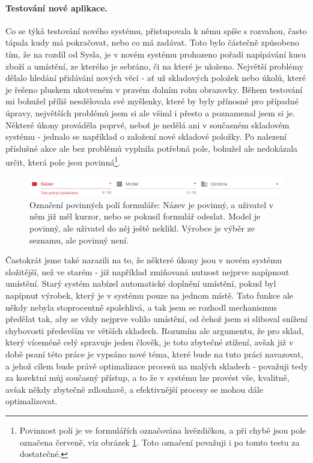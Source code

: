 \paragraph{Testování nové aplikace.} Co se týká testování nového systému, přistupovala k němu spíše s rozvahou, často tápala kudy má pokračovat, nebo co má zadávat. Toto bylo částečně způsobeno tím, že na rozdíl od Sysla, je v novém systému prohozeno pořadí napípávání kusu zboží a umístění, ze kterého je sebráno, či na které je uloženo. Největší problémy dělalo hledání přidávání nových věcí - ať už skladových položek nebo úkolů, které je řešeno pluskem ukotveném v pravém dolním rohu obrazovky. Během testování mi bohužel příliš nesdělovala své myšlenky, které by byly přínosné pro případné úpravy, největších problémů jsem si ale všiml i přesto a poznamenal jsem si je.\\
Některé úkony prováděla poprvé, neboť je nedělá ani v současném skladovém systému - jednalo se například o založení nové skladové položky. Po nalezení příslušné akce ale bez problémů vyplnila potřebná pole, bohužel ale nedokázala určit, která pole jsou povinná\footnote{Povinnost polí je ve formulářích označována hvězdičkou, a při chybě jsou pole označena červeně, viz obrázek \ref{picture:test:required_fields}. Toto označení považuji i po tomto testu za dostatečné.}.\\

\begin{figure}[h]
\includegraphics[width=\textwidth]{../png/app_testing/required_fields.png}
\caption[Označení povinných polí formuláře]{Označení povinných polí formuláře: Název je povinný, a uživatel v něm již měl kurzor, nebo se pokusil formulář odeslat. Model je povinný, ale uživatel do něj ještě neklikl. Výrobce je výběr ze seznamu, ale povinný není.} \label{picture:test:required_fields}
\end{figure}

Častokrát jsme také narazili na to, že některé úkony jsou v novém systému složitější, než ve starém - již například zmiňovaná nutnost nejprve napípnout umístění. Starý systém nabízel automatické doplnění umístění, pokud byl napípnut výrobek, který je v systému pouze na jednom místě. Tato funkce ale někdy nebyla stoprocentně spolehlivá, a tak jsem se rozhodl mechanismus předělat tak, aby se vždy nejprve volilo umístění, od čehož jsem si sliboval snížení chybovosti především ve větších skladech. Rozumím ale argumentu, že pro sklad, který víceméně celý spravuje jeden člověk, je toto zbytečné ztížení, avšak již v době psaní této práce je vypsáno nové téma, které bude na tuto práci navazovat, a jehož cílem bude právě optimalizace procesů na malých skladech - považuji tedy za korektní můj současný přístup, a to že v systému lze provést vše, kvalitně, avšak někdy zbytečně zdlouhavě, a efektivnější procesy se mohou dále optimalizovat.

